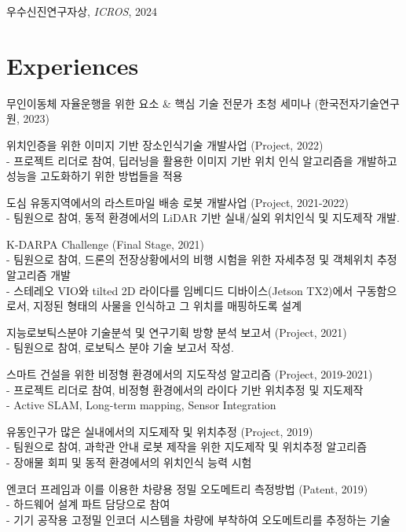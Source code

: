 \documentclass[margin]{res}
\begin{document}
\begin{resume}
		\par 우수신진연구자상, \textit{ICROS}, 2024
		\section{Experiences}
		\par	무인이동체 자율운행을 위한 요소 \& 핵심 기술 전문가 초청 세미나 (한국전자기술연구원, 2023)
		\par	위치인증을 위한 이미지 기반 장소인식기술 개발사업 (Project, 2022) 
		\\- 프로젝트 리더로 참여, 딥러닝을 활용한 이미지 기반 위치 인식 알고리즘을 개발하고 성능을 고도화하기 위한 방법들을 적용
		\par	도심 유동지역에서의 라스트마일 배송 로봇 개발사업 (Project, 2021-2022) 
		\\- 팀원으로 참여, 동적 환경에서의 LiDAR 기반 실내/실외 위치인식 및 지도제작 개발.
		\par	K-DARPA Challenge (Final Stage, 2021)
		\\-	팀원으로 참여, 드론의 전장상황에서의 비행 시험을 위한 자세추정 및 객체위치 추정 알고리즘 개발
		\\-	스테레오 VIO와 tilted 2D 라이다를 임베디드 디바이스(Jetson TX2)에서 구동함으로서, 지정된 형태의 사물을 인식하고 그 위치를 매핑하도록 설계
		\par	지능로보틱스분야 기술분석 및 연구기획 방향 분석 보고서 (Project, 2021)
		\\-	팀원으로 참여, 로보틱스 분야 기술 보고서 작성.
		\par	스마트 건설을 위한 비정형 환경에서의 지도작성 알고리즘 (Project, 2019-2021)
		\\- 프로젝트 리더로 참여, 비정형 환경에서의 라이다 기반 위치추정 및 지도제작
		\\-	Active SLAM, Long-term mapping, Sensor Integration
		\par	유동인구가 많은 실내에서의 지도제작 및 위치추정 (Project, 2019)
		\\-	팀원으로 참여, 과학관 안내 로봇 제작을 위한 지도제작 및 위치추정 알고리즘
		\\-	장애물 회피 및 동적 환경에서의 위치인식 능력 시험
		\par	엔코더 프레임과 이를 이용한 차량용 정밀 오도메트리 측정방법 (Patent, 2019)
		\\-	하드웨어 설계 파트 담당으로 참여
		\\- 기기 공작용 고정밀 인코더 시스템을 차량에 부착하여 오도메트리를 추정하는 기술

\end{resume}
\end{document}
